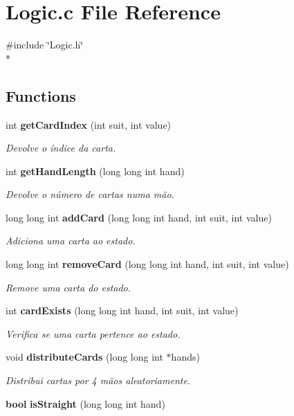 \section{Logic.\+c File Reference}
\label{_logic_8c}
{\ttfamily \#include \char`\"{}Logic.\+h\char`\"{}}\\*
\subsection*{Functions}
\begin{DoxyCompactItemize}
\item 
int {\bf get\+Card\+Index} (int suit, int value)
\begin{DoxyCompactList}\small\item\em Devolve o índice da carta. \end{DoxyCompactList}\item 
int {\bf get\+Hand\+Length} (long long int hand)
\begin{DoxyCompactList}\small\item\em Devolve o número de cartas numa mão. \end{DoxyCompactList}\item 
long long int {\bf add\+Card} (long long int hand, int suit, int value)
\begin{DoxyCompactList}\small\item\em Adiciona uma carta ao estado. \end{DoxyCompactList}\item 
long long int {\bf remove\+Card} (long long int hand, int suit, int value)
\begin{DoxyCompactList}\small\item\em Remove uma carta do estado. \end{DoxyCompactList}\item 
int {\bf card\+Exists} (long long int hand, int suit, int value)
\begin{DoxyCompactList}\small\item\em Verifica se uma carta pertence ao estado. \end{DoxyCompactList}\item 
void {\bf distribute\+Cards} (long long int $\ast$hands)
\begin{DoxyCompactList}\small\item\em Distribui cartas por 4 mãos aleatoriamente. \end{DoxyCompactList}\item 
{\bf bool} {\bf is\+Straight} (long long int hand)

\end{DoxyCompactItemize}
